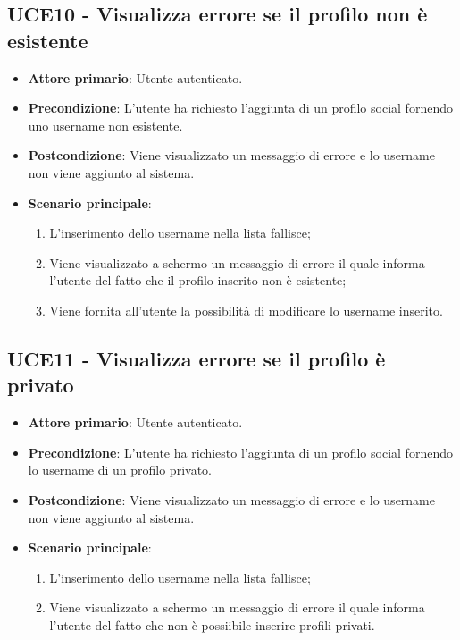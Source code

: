 \subsection{UCE10 - Visualizza errore se il profilo non è esistente}
\begin{itemize}
    \item \textbf{Attore primario}: Utente autenticato.
    \item \textbf{Precondizione}: L’utente ha richiesto l’aggiunta di un profilo social fornendo uno username non esistente.
    \item \textbf{Postcondizione}: Viene visualizzato un messaggio di errore e lo username non viene aggiunto al sistema.
    \item \textbf{Scenario principale}: 
    \begin{enumerate}
        \item L'inserimento dello username nella lista fallisce;
        \item Viene visualizzato a schermo un messaggio di errore il quale informa l'utente del fatto che il profilo inserito non è esistente;
        \item Viene fornita all'utente la possibilità di modificare lo username inserito.
    \end{enumerate}
\end{itemize}

\subsection{UCE11 - Visualizza errore se il profilo è privato}
\begin{itemize}
    \item \textbf{Attore primario}: Utente autenticato.
    \item \textbf{Precondizione}: L’utente ha richiesto l’aggiunta di un profilo social fornendo lo username di un profilo privato.
    \item \textbf{Postcondizione}: Viene visualizzato un messaggio di errore e lo username non viene aggiunto al sistema.
    \item \textbf{Scenario principale}: 
    \begin{enumerate}
        \item L'inserimento dello username nella lista fallisce;
        \item Viene visualizzato a schermo un messaggio di errore il quale informa l'utente del fatto che non è possiibile inserire profili privati.
    \end{enumerate}
\end{itemize}

